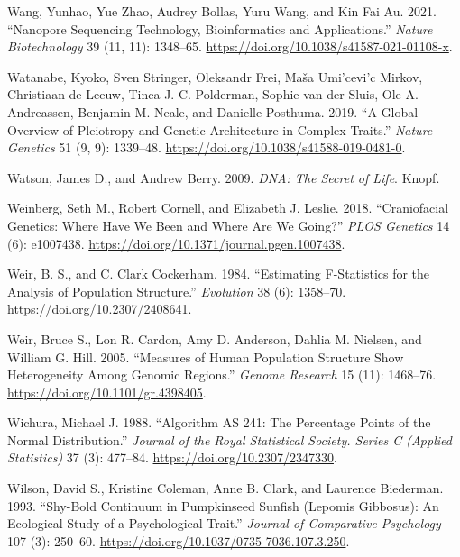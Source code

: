 \documentclass[
]{book}
\newlength{\cslhangindent}
\newlength{\cslentryspacingunit} %
\newenvironment{CSLReferences}[2] %
 {%
  \setlength{\parindent}{0pt}
  \ifodd #1
  \let\oldpar\par
  \def\par{\hangindent=\cslhangindent\oldpar}
  \fi
  \setlength{\parskip}{#2\cslentryspacingunit}
 }%
 {}
\begin{document}
\begin{CSLReferences}{1}{0}
\leavevmode{}%
Wang, Yunhao, Yue Zhao, Audrey Bollas, Yuru Wang, and Kin Fai Au. 2021. {``Nanopore Sequencing Technology, Bioinformatics and Applications.''} \emph{Nature Biotechnology} 39 (11, 11): 1348--65. \url{https://doi.org/10.1038/s41587-021-01108-x}.

\leavevmode{}%
Watanabe, Kyoko, Sven Stringer, Oleksandr Frei, Maša Umi'cevi'c Mirkov, Christiaan de Leeuw, Tinca J. C. Polderman, Sophie van der Sluis, Ole A. Andreassen, Benjamin M. Neale, and Danielle Posthuma. 2019. {``A Global Overview of Pleiotropy and Genetic Architecture in Complex Traits.''} \emph{Nature Genetics} 51 (9, 9): 1339--48. \url{https://doi.org/10.1038/s41588-019-0481-0}.

\leavevmode{}%
Watson, James D., and Andrew Berry. 2009. \emph{{DNA}: {The} Secret of Life}. {Knopf}.

\leavevmode{}%
Weinberg, Seth M., Robert Cornell, and Elizabeth J. Leslie. 2018. {``Craniofacial Genetics: {Where} Have We Been and Where Are We Going?''} \emph{PLOS Genetics} 14 (6): e1007438. \url{https://doi.org/10.1371/journal.pgen.1007438}.

\leavevmode{}%
Weir, B. S., and C. Clark Cockerham. 1984. {``Estimating {F-Statistics} for the {Analysis} of {Population Structure}.''} \emph{Evolution} 38 (6): 1358--70. \url{https://doi.org/10.2307/2408641}.

\leavevmode{}%
Weir, Bruce S., Lon R. Cardon, Amy D. Anderson, Dahlia M. Nielsen, and William G. Hill. 2005. {``Measures of Human Population Structure Show Heterogeneity Among Genomic Regions.''} \emph{Genome Research} 15 (11): 1468--76. \url{https://doi.org/10.1101/gr.4398405}.

\leavevmode{}%
Wichura, Michael J. 1988. {``Algorithm {AS} 241: {The Percentage Points} of the {Normal Distribution}.''} \emph{Journal of the Royal Statistical Society. Series C (Applied Statistics)} 37 (3): 477--84. \url{https://doi.org/10.2307/2347330}.

\leavevmode{}%
Wilson, David S., Kristine Coleman, Anne B. Clark, and Laurence Biederman. 1993. {``Shy-Bold Continuum in Pumpkinseed Sunfish ({Lepomis} Gibbosus): {An} Ecological Study of a Psychological Trait.''} \emph{Journal of Comparative Psychology} 107 (3): 250--60. \url{https://doi.org/10.1037/0735-7036.107.3.250}.


\end{CSLReferences}
\end{document}
